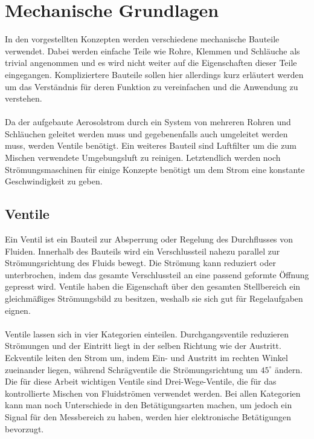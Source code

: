 \section{Mechanische Grundlagen}
In den vorgestellten Konzepten werden verschiedene mechanische Bauteile verwendet. Dabei werden einfache Teile wie Rohre, Klemmen und Schl\"{a}uche als trivial angenommen und es wird nicht weiter auf die Eigenschaften dieser Teile eingegangen. Kompliziertere Bauteile sollen hier allerdings kurz erl\"{a}utert werden um das Verst\"{a}ndnis f\"{u}r deren Funktion zu vereinfachen und die Anwendung zu verstehen.
\\\\
Da der aufgebaute Aerosolstrom durch ein System von mehreren Rohren und Schl\"{a}uchen geleitet werden muss und gegebenenfalls auch umgeleitet werden muss, werden Ventile ben\"{o}tigt. Ein weiteres Bauteil sind Luftfilter um die zum Mischen verwendete Umgebungsluft zu reinigen. Letztendlich werden noch Str\"{o}mungsmaschinen f\"{u}r einige Konzepte ben\"{o}tigt um dem Strom eine konstante Geschwindigkeit zu geben.

\subsection{Ventile}
Ein Ventil ist ein Bauteil zur Absperrung oder Regelung des Durchflusses von Fluiden. Innerhalb des Bauteils wird ein Verschlussteil nahezu parallel zur Str\"{o}mungsrichtung des Fluids bewegt. Die Str\"{o}mung kann reduziert oder unterbrochen, indem das gesamte Verschlussteil an eine passend geformte \"{O}ffnung gepresst wird. Ventile haben die Eigenschaft \"{u}ber den gesamten Stellbereich ein gleichm\"{a}{\ss}iges Str\"{o}mungsbild zu besitzen, weshalb sie sich gut f\"{u}r Regelaufgaben eignen.
\\\\
Ventile lassen sich in vier Kategorien einteilen. Durchgangsventile reduzieren Str\"{o}mungen und der Eintritt liegt in der selben Richtung wie der Austritt. Eckventile leiten den Strom um, indem Ein- und Austritt im rechten Winkel zueinander liegen, w\"{a}hrend Schr\"{a}gventile die Str\"{o}mungsrichtung um \(45^\circ\) \"{a}ndern. Die f\"{u}r diese Arbeit wichtigen Ventile sind Drei-Wege-Ventile, die f\"{u}r das kontrollierte Mischen von Fluidstr\"{o}men verwendet werden. Bei allen Kategorien kann man noch Unterschiede in den Bet\"{a}tigungsarten machen, um jedoch ein Signal f\"{u}r den Messbereich zu haben, werden hier elektronische Bet\"{a}tigungen bevorzugt\cite{ventil}.

